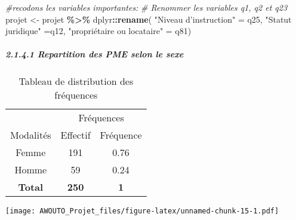 \documentclass[
]{article}
\newenvironment{Shaded}{\begin{snugshade}}{\end{snugshade}}
\newcommand{\CommentTok}[1]{\textcolor[rgb]{0.56,0.35,0.01}{\textit{#1}}}
\newcommand{\FunctionTok}[1]{\textcolor[rgb]{0.13,0.29,0.53}{\textbf{#1}}}
\newcommand{\NormalTok}[1]{#1}
\newcommand{\OtherTok}[1]{\textcolor[rgb]{0.56,0.35,0.01}{#1}}
\newcommand{\SpecialCharTok}[1]{\textcolor[rgb]{0.81,0.36,0.00}{\textbf{#1}}}
\newcommand{\StringTok}[1]{\textcolor[rgb]{0.31,0.60,0.02}{#1}}
\begin{document}
\begin{Shaded}
\begin{Highlighting}[]
\CommentTok{\#recodons les variables importantes:}
\CommentTok{\# Renommer les variables q1, q2 et q23}
\NormalTok{projet }\OtherTok{\textless{}{-}}\NormalTok{ projet }\SpecialCharTok{\%\textgreater{}\%}
\NormalTok{  dplyr}\SpecialCharTok{::}\FunctionTok{rename}\NormalTok{(    }\StringTok{"Niveau d’instruction"} \OtherTok{=}\NormalTok{ q25,}
                   \StringTok{"Statut juridique"} \OtherTok{=}\NormalTok{q12,}
                  \StringTok{"propriétaire ou locataire"} \OtherTok{=}\NormalTok{ q81)}
\end{Highlighting}
\end{Shaded}

\hypertarget{repartition-des-pme-selon-le-sexe}{%
\subparagraph{2.1.4.1 Repartition des PME selon le
sexe}\label{repartition-des-pme-selon-le-sexe}}

\begin{Shaded}
\end{Shaded}

\begin{longtable}[t]{ccc}
\caption{\label{tab:unnamed-chunk-15}Tableau de distribution des fréquences}\\
\toprule
\multicolumn{1}{c}{ } & \multicolumn{2}{c}{Fréquences} \\
\cmidrule(l{3pt}r{3pt}){2-3}
Modalités & Effectif & Fréquence\\
\midrule
Femme & 191 & 0.76\\
Homme & 59 & 0.24\\
\textbf{Total} & \textbf{250} & \textbf{1}\\
\bottomrule
\end{longtable}

\begin{Shaded}
\end{Shaded}

\texttt{[image: AWOUTO\_Projet\_files/figure-latex/unnamed-chunk-15-1.pdf]}
\end{document}
